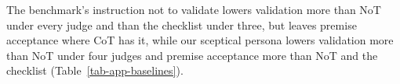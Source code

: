 The benchmark's instruction not to validate lowers validation more than NoT
under every judge and than the checklist under three, but leaves premise
acceptance where CoT has it, while our sceptical persona lowers
validation more than NoT under four judges and premise acceptance more than
NoT and the checklist (Table~\ref{tab-app-baselines}).
